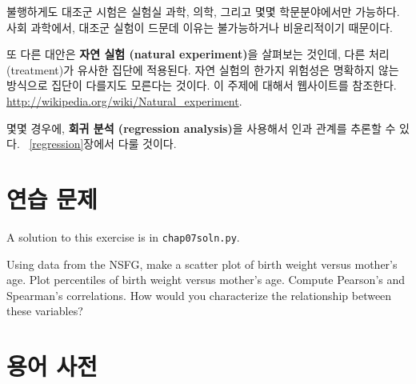 불행하게도 대조군 시험은 실험실 과학, 의학, 그리고 몇몇 학문분야에서만 가능하다. 사회 과학에서, 대조군 실험이 드문데 이유는 불가능하거나 비윤리적이기 때문이다.

또 다른 대안은 {\bf 자연 실험 (natural experiment)}을 살펴보는 것인데, 다른 처리(treatment)가 유사한 집단에 적용된다. 자연 실험의 한가지 위험성은 명확하지 않는 방식으로 집단이 다를지도 모른다는 것이다.
이 주제에 대해서 웹사이트를 참조한다. \url{http://wikipedia.org/wiki/Natural_experiment}.

몇몇 경우에, {\bf 회귀 분석 (regression analysis)}을 사용해서 인과 관계를 추론할 수 있다. ~\ref{regression}장에서 다룰 것이다.


\section{연습 문제}

A solution to this exercise is in \verb"chap07soln.py".

\begin{exercise}
Using data from the NSFG, make a scatter plot of birth weight
versus mother's age.  Plot percentiles of birth weight
versus mother's age.  Compute Pearson's and Spearman's correlations.
How would you characterize the relationship
between these variables?
\end{exercise}


\section{용어 사전}

